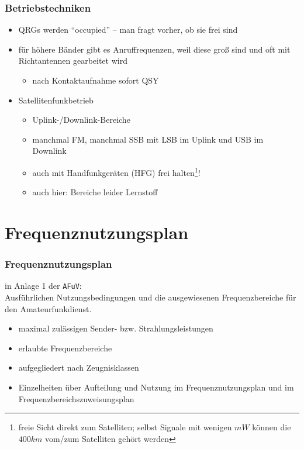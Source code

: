 \begin{frame}
  \frametitle{Betriebstechniken}

  \begin{itemize}
    \item QRGs werden ``occupied'' -- man fragt vorher, ob sie frei sind
    \item für höhere Bänder gibt es Anruf\/frequenzen, weil diese groß sind und oft mit
      Richtantennen gearbeitet wird
      \begin{itemize}
        \item nach Kontaktaufnahme sofort QSY
      \end{itemize}
    \item Satellitenfunkbetrieb
      \begin{itemize}
        \item Uplink-/Downlink-Bereiche
        \item manchmal FM, manchmal SSB mit LSB im Uplink und USB im Downlink
        \item auch mit Handfunkgeräten (HFG) frei halten\footnote{freie
          Sicht direkt zum Satelliten; selbst Signale mit wenigen $mW$
          können die $400km$ vom/zum Satelliten gehört werden}!
        \item auch hier: Bereiche leider Lernstoff
      \end{itemize}
  \end{itemize}

\end{frame}

\section[Frequenz\-nutzungs\-plan]{Frequenznutzungsplan}

\begin{frame}
  \frametitle{Frequenznutzungsplan}

  in Anlage 1 der \texttt{AFuV}\cite{afuv}: \\[1em]


  Ausführlichen Nutzungsbedingungen und die ausgewiesenen Frequenzbereiche für
  den Amateurfunkdienst.

  \begin{itemize}
    \item maximal zulässigen Sender- bzw. Strahlungsleistungen
    \item erlaubte Frequenzbereiche
    \item aufgegliedert nach Zeugnisklassen
    \item Einzelheiten über Aufteilung und Nutzung im
      Frequenznutzungsplan und im Frequenzbereichszuweisungsplan
  \end{itemize}

\end{frame}

